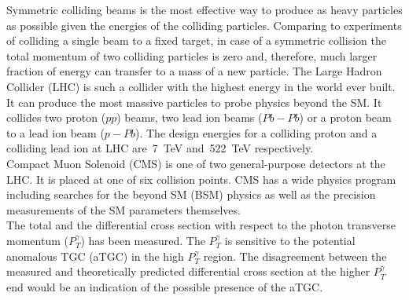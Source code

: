 Symmetric colliding beams is the most effective way to produce as heavy particles as possible given the energies of the colliding particles. Comparing to experiments of colliding a single beam to a fixed target, in case of a symmetric collision the total momentum of two colliding particles is zero and, therefore, much larger fraction of energy can transfer to a mass of a new particle.  The Large Hadron Collider (LHC) is such a collider with the highest energy in the world ever built. It can produce the most massive particles to probe physics beyond the SM. It collides two proton ($pp$) beams, two lead ion beams ($Pb-Pb$) or a proton beam to a lead ion beam ($p-Pb$). The design energies for a colliding proton and a colliding lead ion at LHC are~7~TeV and~522~TeV respectively. \\

Compact Muon Solenoid (CMS) is one of two general-purpose detectors at the LHC. It is placed at one of six collision points. CMS has a wide physics program including searches for the beyond SM (BSM) physics as well as the precision measurements of the SM parameters themselves.\\



The total and the differential cross section with respect to the photon transverse momentum ($P_T^\gamma$) has been measured. The $P_T^{\gamma}$ is sensitive to the potential anomalous TGC (aTGC) in the high $P_T^{\gamma}$ region. The disagreement between the measured and theoretically predicted differential cross section at the higher $P_T^{\gamma}$ end would be an indication of the possible presence of the aTGC. \\

